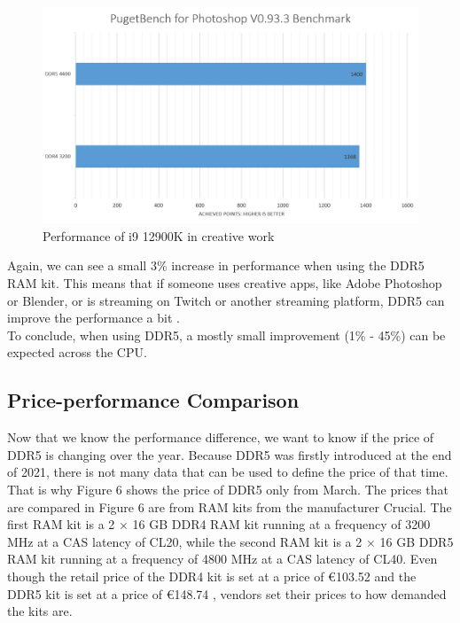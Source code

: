\begin{figure}[H]
    \centering
    \includegraphics[width=13cm]{figures/Diagram PugetBench.png}
    \caption{Performance of i9 12900K in creative work \parencite{pugetbench_test}}
\end{figure}

Again, we can see a small 3\% increase in performance when using the DDR5 RAM kit. This means that if someone uses creative apps, like Adobe Photoshop or Blender, or is streaming on Twitch or another streaming platform, DDR5 can improve the performance a bit \parencite{pugetbench_test}.
\\
To conclude, when using DDR5, a mostly small improvement (1\% - 45\%) can be expected across the CPU.

\newpage

\subsection{Price-performance Comparison}

Now that we know the performance difference, we want to know if the price of DDR5 is changing over the year. Because DDR5 was firstly introduced at the end of 2021, there is not many data that can be used to define the price of that time. That is why Figure 6 shows the price of DDR5 only from March. The prices that are compared in Figure 6 are from RAM kits from the manufacturer Crucial. The first RAM kit is a 2 × 16 GB DDR4 RAM kit running at a frequency of 3200 MHz at a CAS latency of CL20, while the second RAM kit is a 2 × 16 GB DDR5 RAM kit running at a frequency of 4800 MHz at a CAS latency of CL40. Even though the retail price of the DDR4 kit is set at a price of €103.52 \parencite{Crucial_ddr4} and the DDR5 kit is set at a price of €148.74 \parencite{Crucial_ddr5}, vendors set their prices to how demanded the kits are.

